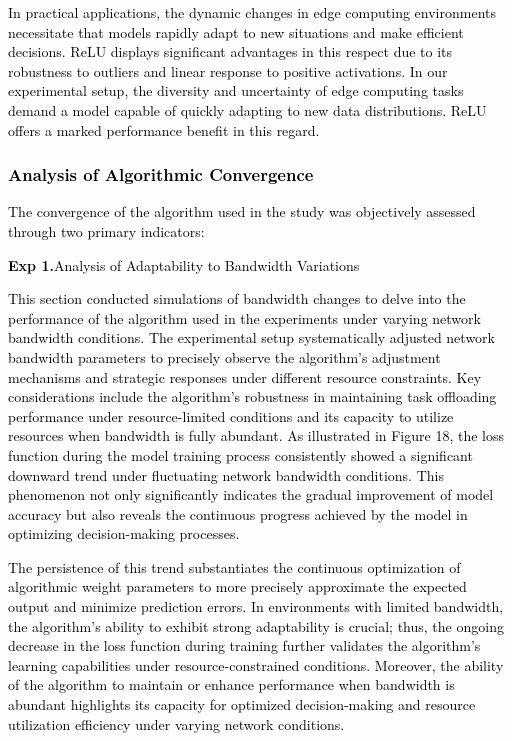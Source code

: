\documentclass[preprint,12pt]{elsarticle}
\begin{document}
\textcolor{black}{In practical applications, the dynamic changes in edge computing environments necessitate that models rapidly adapt to new situations and make efficient decisions. ReLU displays significant advantages in this respect due to its robustness to outliers and linear response to positive activations. In our experimental setup, the diversity and uncertainty of edge computing tasks demand a model capable of quickly adapting to new data distributions. ReLU offers a marked performance benefit in this regard.}

\textcolor{black}{\subsubsection{Analysis of Algorithmic Convergence}}

\textcolor{black}{The convergence of the algorithm used in the study was objectively assessed through two primary indicators:}

\textcolor{black}{\textbf{Exp 1.}Analysis of Adaptability to Bandwidth Variations}

\textcolor{black}{This section conducted simulations of bandwidth changes to delve into the performance of the algorithm used in the experiments under varying network bandwidth conditions. The experimental setup systematically adjusted network bandwidth parameters to precisely observe the algorithm's adjustment mechanisms and strategic responses under different resource constraints. Key considerations include the algorithm's robustness in maintaining task offloading performance under resource-limited conditions and its capacity to utilize resources when bandwidth is fully abundant. As illustrated in Figure 18, the loss function during the model training process consistently showed a significant downward trend under fluctuating network bandwidth conditions. This phenomenon not only significantly indicates the gradual improvement of model accuracy but also reveals the continuous progress achieved by the model in optimizing decision-making processes.}

\textcolor{black}{The persistence of this trend substantiates the continuous optimization of algorithmic weight parameters to more precisely approximate the expected output and minimize prediction errors. In environments with limited bandwidth, the algorithm's ability to exhibit strong adaptability is crucial; thus, the ongoing decrease in the loss function during training further validates the algorithm's learning capabilities under resource-constrained conditions. Moreover, the ability of the algorithm to maintain or enhance performance when bandwidth is abundant highlights its capacity for optimized decision-making and resource utilization efficiency under varying network conditions.}
\end{document}
